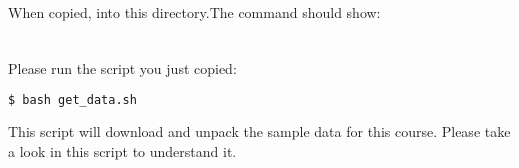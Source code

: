 \begin{frame}[fragile]
  \frametitle{}
  \begin{columns}[t]
	 \begin{column}{.5\textwidth}
		When copied,  into this directory.\newline The command  should show:
	 \end{column}
	 \begin{column}{.5\textwidth}
	   \begin{minipage}[t]{0.5\textwidth}
		 {\footnotesize \DTsetlength{0.2em}{1em}{0.2em}{0.4pt}{.6pt}
			 }
      \end{minipage}
	\end{column}
  \end{columns}
\end{frame}

\begin{frame}[fragile]
  \frametitle{}
  Please run the  script you just copied:
  \begin{lstlisting}[language=Bash, style=Shell,basicstyle=\footnotesize]
$ bash get_data.sh
  \end{lstlisting}
  \begin{task}
  	This script will download and unpack the sample data for this course. Please take a look in this script to understand it. 
  \end{task}
\end{frame}